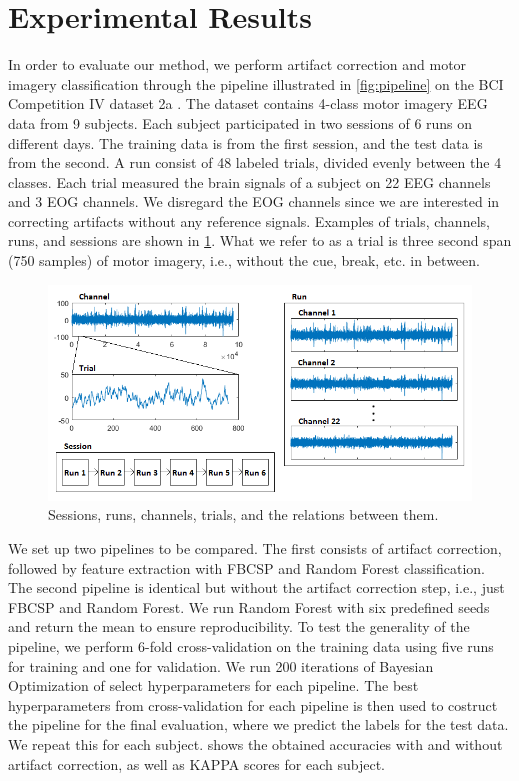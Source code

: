 \section{Experimental Results}\label{sec:results}
In order to evaluate our method, we perform artifact correction and motor imagery classification through the pipeline illustrated in \cref{fig:pipeline} on the BCI Competition IV dataset 2a \citep{brunner2008bci}. The dataset contains 4-class motor imagery EEG data from 9 subjects. Each subject participated in two sessions of 6 runs on different days. The training data is from the first session, and the test data is from the second. A run consist of 48 labeled trials, divided evenly between the 4 classes. Each trial measured the brain signals of a subject on 22 EEG channels and 3 EOG channels. We disregard the EOG channels since we are interested in correcting artifacts without any reference signals. Examples of trials, channels, runs, and sessions are shown in \cref{fig:dataset}. What we refer to as a trial is three second span (750 samples) of motor imagery, i.e., without the cue, break, etc. in between.

\begin{figure}
	\centering
	\begin{adjustbox}{width=\textwidth}
		\includegraphics{figures/bciiv2a.png}
	\end{adjustbox}
	\caption{Sessions, runs, channels, trials, and the relations between them.}
	\label{fig:dataset}
\end{figure}

We set up two pipelines to be compared. The first consists of artifact correction, followed by feature extraction with FBCSP and Random Forest classification. The second pipeline is identical but without the artifact correction step, i.e., just FBCSP and Random Forest. We run Random Forest with six predefined seeds and return the mean to ensure reproducibility. 
To test the generality of the pipeline, we perform 6-fold cross-validation on the training data using five runs for training and one for validation. We run 200 iterations of Bayesian Optimization of select hyperparameters for each pipeline. The best hyperparameters from cross-validation for each pipeline is then used to costruct the pipeline for the final evaluation, where we predict the labels for the test data. We repeat this for each subject. 
 shows the obtained accuracies with and without artifact correction, as well as KAPPA scores for each subject. 

